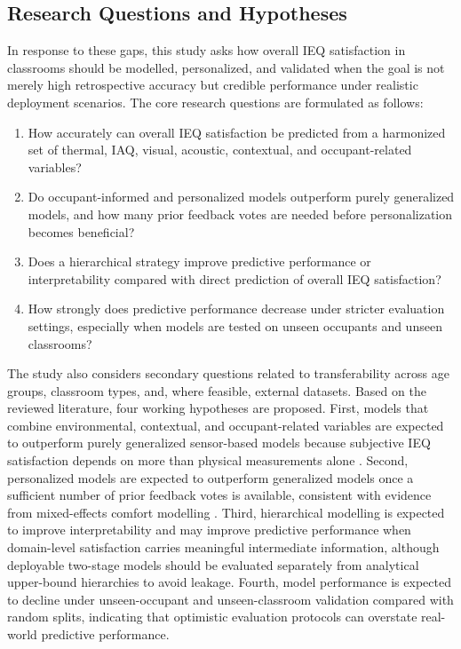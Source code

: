 \documentclass[11pt]{article}
\begin{document}
\subsection{Research Questions and Hypotheses}

In response to these gaps, this study asks how overall IEQ satisfaction in classrooms should be modelled, personalized, and validated when the goal is not merely high retrospective accuracy but credible performance under realistic deployment scenarios. The core research questions are formulated as follows:

\begin{enumerate}
    \item How accurately can overall IEQ satisfaction be predicted from a harmonized set of thermal, IAQ, visual, acoustic, contextual, and occupant-related variables?
    \item Do occupant-informed and personalized models outperform purely generalized models, and how many prior feedback votes are needed before personalization becomes beneficial?
    \item Does a hierarchical strategy improve predictive performance or interpretability compared with direct prediction of overall IEQ satisfaction?
    \item How strongly does predictive performance decrease under stricter evaluation settings, especially when models are tested on unseen occupants and unseen classrooms?
\end{enumerate}

The study also considers secondary questions related to transferability across age groups, classroom types, and, where feasible, external datasets. Based on the reviewed literature, four working hypotheses are proposed. First, models that combine environmental, contextual, and occupant-related variables are expected to outperform purely generalized sensor-based models because subjective IEQ satisfaction depends on more than physical measurements alone \cite{carton2026review}. Second, personalized models are expected to outperform generalized models once a sufficient number of prior feedback votes is available, consistent with evidence from mixed-effects comfort modelling \cite{carton2024mixed}. Third, hierarchical modelling is expected to improve interpretability and may improve predictive performance when domain-level satisfaction carries meaningful intermediate information, although deployable two-stage models should be evaluated separately from analytical upper-bound hierarchies to avoid leakage. Fourth, model performance is expected to decline under unseen-occupant and unseen-classroom validation compared with random splits, indicating that optimistic evaluation protocols can overstate real-world predictive performance.
\end{document}
